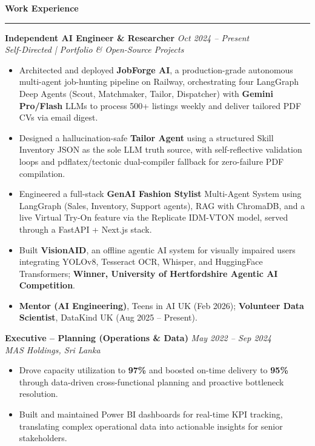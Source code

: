 \documentclass[a4paper,10pt]{article}
\newcommand{\sect}[1]{\vspace{8pt}\noindent\textbf{\color{heading}\large #1}\vspace{3pt}\hrule\vspace{6pt}}
\begin{document}
\sect{Work Experience}

\noindent\textbf{Independent AI Engineer \& Researcher} \hfill \textit{Oct 2024 -- Present} \\
\textit{Self-Directed | Portfolio \& Open-Source Projects}
\begin{itemize}[leftmargin=*, topsep=4pt, itemsep=2pt]
    \item Architected and deployed \textbf{JobForge AI}, a production-grade autonomous multi-agent job-hunting pipeline on Railway, orchestrating four LangGraph Deep Agents (Scout, Matchmaker, Tailor, Dispatcher) with \textbf{Gemini Pro/Flash} LLMs to process 500+ listings weekly and deliver tailored PDF CVs via email digest.
    \item Designed a hallucination-safe \textbf{Tailor Agent} using a structured Skill Inventory JSON as the sole LLM truth source, with self-reflective validation loops and pdflatex/tectonic dual-compiler fallback for zero-failure PDF compilation.
    \item Engineered a full-stack \textbf{GenAI Fashion Stylist} Multi-Agent System using LangGraph (Sales, Inventory, Support agents), RAG with ChromaDB, and a live Virtual Try-On feature via the Replicate IDM-VTON model, served through a FastAPI + Next.js stack.
    \item Built \textbf{VisionAID}, an offline agentic AI system for visually impaired users integrating YOLOv8, Tesseract OCR, Whisper, and HuggingFace Transformers; \textbf{Winner, University of Hertfordshire Agentic AI Competition}.
    \item \textbf{Mentor (AI Engineering)}, Teens in AI UK (Feb 2026); \textbf{Volunteer Data Scientist}, DataKind UK (Aug 2025 -- Present).
\end{itemize}
\vspace{4pt}

\noindent\textbf{Executive -- Planning (Operations \& Data)} \hfill \textit{May 2022 -- Sep 2024} \\
\textit{MAS Holdings, Sri Lanka}
\begin{itemize}[leftmargin=*, topsep=2pt, itemsep=1pt]
    \item Drove capacity utilization to \textbf{97\%} and boosted on-time delivery to \textbf{95\%} through data-driven cross-functional planning and proactive bottleneck resolution.
    \item Built and maintained Power BI dashboards for real-time KPI tracking, translating complex operational data into actionable insights for senior stakeholders.
\end{itemize}
\vspace{4pt}
\end{document}

